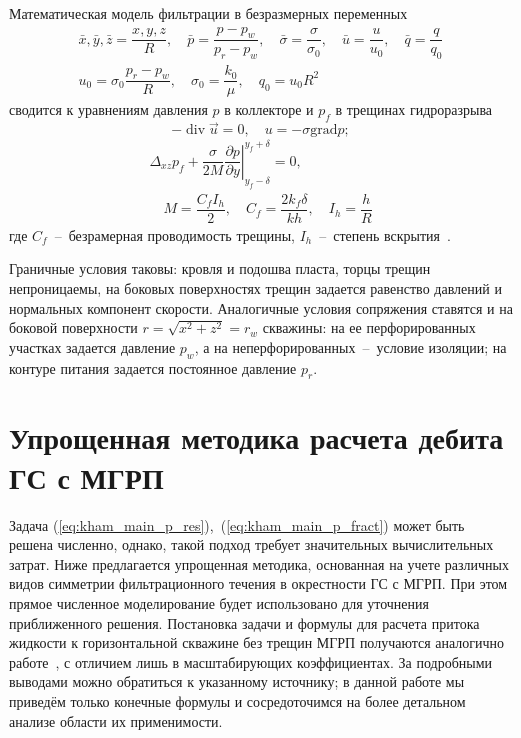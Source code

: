 \documentclass{article}
\begin{document}
Математическая модель фильтрации в безразмерных переменных
\begin{equation*}
	\displaystyle
	\begin{gathered}
		\bar{x},\bar{y},\bar{z} = \dfrac{x,y,z}{R}, \quad
		\bar{p} = \dfrac{p - p_w}{p_r - p_w}, \quad
		\bar{\sigma} = \dfrac{\sigma}{\sigma_0}, \quad
		\bar{u}=\dfrac{u}{u_0},  \quad
		\bar{q} = \dfrac{q}{q_0}    \\
		u_0 = \sigma_0 \dfrac{p_r - p_w}{R}, \quad
		\sigma_0 = \dfrac{k_0}{\mu}, \quad
		q_0 = u_0 R^2
	\end{gathered}
\end{equation*}
сводится  к уравнениям  давления $p$ в коллекторе и $p_f$ в трещинах
гидроразрыва~\cite{lit:kham_mazo_uzku_2015}
\begin{equation}
	\displaystyle
	- \operatorname{div} \vec{u} = 0, \quad u=-\sigma \text{grad} p;
	\label{eq:kham_main_p_res}
\end{equation}
\begin{equation}
	\displaystyle
	\begin{gathered}
		\Delta_{xz} p_f + \dfrac{\sigma}{2M}\left.\dfrac{\partial p}{\partial y} \right|_{y_f - \delta}^{y_f + \delta} = 0, \\[8pt]
		\quad M = \dfrac{C_f I_h}{2}, \quad C_f = \dfrac{2 k_f \delta}{k h}, \quad I_h=\dfrac{h}{R}
	\end{gathered}
	\label{eq:kham_main_p_fract}
\end{equation}
где $C_f$~--~безрамерная проводимость трещины, $I_h$~--~степень
вскрытия~\cite{lit:kham_valko_economides_2001}.

Граничные условия таковы: кровля и подошва пласта, торцы трещин
непроницаемы, на боковых поверхностях трещин задается равенство давлений и
нормальных компонент скорости. Аналогичные условия сопряжения ставятся и на
боковой поверхности $r=\sqrt{x^2 + z^2} = r_w$ скважины: на ее перфорированных
участках задается давление $p_w$, а на неперфорированных~--~условие изоляции;
на контуре питания задается постоянное давление $p_r$.

\section{Упрощенная методика расчета дебита ГС с МГРП}

Задача (\ref{eq:kham_main_p_res}),~(\ref{eq:kham_main_p_fract}) может быть
решена численно, однако, такой подход требует значительных вычислительных затрат.
Ниже предлагается упрощенная методика, основанная на учете различных видов симметрии
фильтрационного течения в окрестности ГС с МГРП. При этом прямое численное моделирование
будет использовано для уточнения приближенного решения.
Постановка задачи и формулы для расчета притока жидкости к горизонтальной
скважине без трещин МГРП получаются аналогично работе~\cite{lit:kham_mazo_uzku_2015},
с отличием лишь в масштабирующих коэффициентах. За подробными выводами можно
обратиться к указанному источнику;
в данной работе мы приведём только конечные формулы и сосредоточимся
на более детальном анализе области их применимости.
\end{document}
